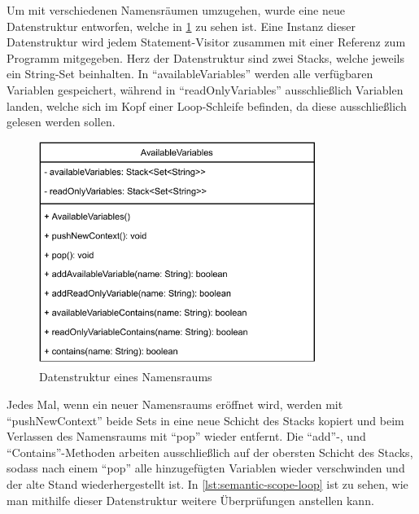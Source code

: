 Um mit verschiedenen Namensräumen umzugehen, wurde eine neue Datenstruktur entworfen, welche in \cref{pic:Semantic-Scope} zu sehen ist. Eine Instanz dieser Datenstruktur wird jedem Statement-Visitor zusammen mit einer Referenz zum Programm mitgegeben. Herz der Datenstruktur sind zwei Stacks, welche jeweils ein String-Set beinhalten. In \enquote{availableVariables} werden alle verfügbaren Variablen gespeichert, während in \enquote{readOnlyVariables} ausschließlich Variablen landen, welche sich im Kopf einer Loop-Schleife befinden, da diese ausschließlich gelesen werden sollen.

\begin{figure}[h!]
	\centering
	\includegraphics[width=9cm]{content/pictures/AvailableVar.pdf}
	\caption{Datenstruktur eines Namensraums}
	\label{pic:Semantic-Scope}
\end{figure}

Jedes Mal, wenn ein neuer Namensraums eröffnet wird, werden mit \enquote{pushNewContext} beide Sets in eine neue Schicht des Stacks kopiert und beim Verlassen des Namensraums mit \enquote{pop} wieder entfernt. Die \enquote{add}-, und \enquote{Contains}-Methoden arbeiten ausschließlich auf der obersten Schicht des Stacks, sodass nach einem \enquote{pop} alle hinzugefügten Variablen wieder verschwinden und der alte Stand wiederhergestellt ist. In \cref{lst:semantic-scope-loop} ist zu sehen, wie man mithilfe dieser Datenstruktur weitere Überprüfungen anstellen kann.

